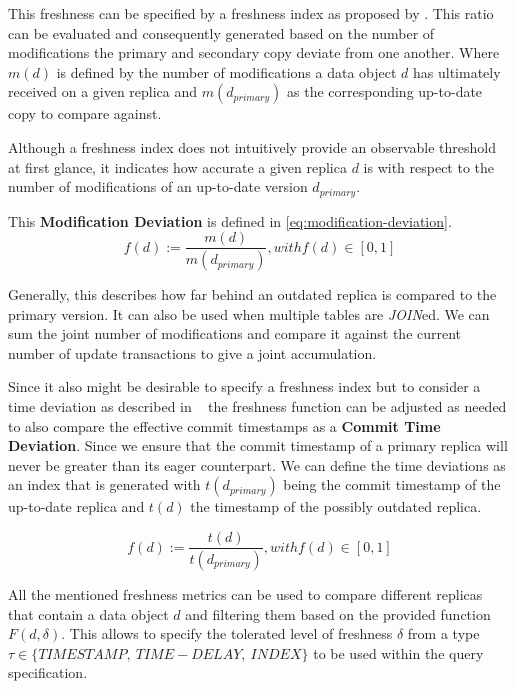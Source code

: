 \begin{description}
        This freshness can be specified by a freshness index as proposed by \cite{rohm:2002}.
        This ratio can be evaluated and consequently generated based on the number of modifications the primary and 
        secondary copy deviate from one another. Where $m(d)$ is defined by the number of modifications a data object $d$ has ultimately received on a given replica
        and $m(d_{primary})$ as the corresponding up-to-date copy to compare against. 

        Although a freshness index does not intuitively provide an observable threshold at first glance, it indicates how accurate a 
        given replica $d$ is with respect to the number of modifications of an up-to-date version $d_{primary}$.

        This \textbf{Modification Deviation} is defined in \ref{eq:modification-deviation}.
        \begin{equation} \label{eq:modification-deviation}
            f(d) := \frac{m(d)}{m(d_{primary})},  with f(d) \in [0,1]
        \end{equation}
        
        Generally, this describes how far behind an outdated replica is compared to the primary version.
        It can also be used when multiple tables are \emph{JOIN}ed.
        We can sum the joint number of modifications and compare it against the current number of update transactions to give a joint accumulation.

        Since it also might be desirable to specify a freshness index but to consider a time deviation as described in ~\cite{voicu:2010,hennemann_sw_2021}
        the freshness function can be adjusted as needed to also compare the effective commit timestamps as a \textbf{Commit Time Deviation}.
        Since we ensure that the commit timestamp of a primary replica will never be greater than its eager counterpart. We can define the time deviations as an index that is 
        generated with $t(d_{primary})$ being the commit timestamp of the up-to-date replica and $t(d)$ the timestamp of the possibly outdated replica.


        \begin{equation}
            f(d) := \frac{t(d)}{t(d_{primary})},  with f(d) \in [0,1]
        \end{equation}

\end{description}

All the mentioned freshness metrics can be used to compare different replicas that contain a data object $d$ and filtering them based on the provided function $F(d, \delta)$.
This allows to specify the tolerated level of freshness $\delta$ from a type $\tau \in \{TIMESTAMP, \:TIME-DELAY, \:INDEX\}$ to be used within the query specification.

